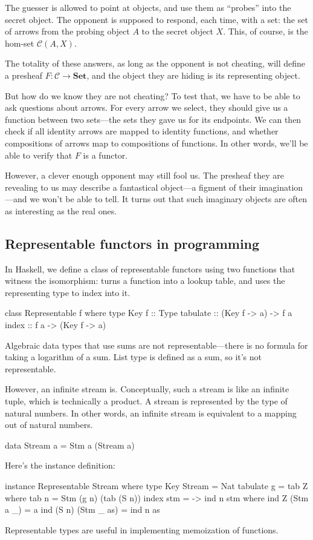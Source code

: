 \documentclass[DaoFP]{subfiles}
\begin{document}
The guesser is allowed to point at objects, and use them as ``probes'' into the secret object. The opponent is supposed to respond, each time, with a set: the set of arrows from the probing object $A$ to the secret object $X$. This, of course, is the hom-set $\mathcal{C}(A, X)$. 

The totality of these answers, as long as the opponent is not cheating, will define a presheaf $F \colon \mathcal{C} \to \mathbf{Set}$, and the object they are hiding is its representing object. 

But how do we know they are not cheating? To test that, we have to be able to ask questions about arrows. For every arrow we select, they should give us a function between two sets---the sets they gave us for its endpoints. We can then check if all identity arrows are mapped to identity functions, and whether compositions of arrows map to compositions of functions. In other words, we'll be able to verify that $F$ is a functor. 

However, a clever enough opponent may still fool us. The presheaf they are revealing to us may describe a fantastical object---a figment of their imagination---and we won't be able to tell. It turns out that such imaginary objects are often as interesting as the real ones. 

\subsection{Representable functors in programming}

In Haskell, we define a class of representable functors using two functions that witness the isomorphism:  turns a function into a lookup table, and  uses the representing type  to index into it.

\begin{haskell}
class Representable f where
  type Key f :: Type
  tabulate :: (Key f -> a) -> f a
  index    :: f a -> (Key f -> a)
\end{haskell}

Algebraic data types that use sums are not representable---there is no formula for taking a logarithm of a sum. List type is defined as a sum, so it's not representable. 

However, an infinite stream is. Conceptually, such a stream is like an infinite tuple, which is technically a product. A stream is represented by the type of natural numbers. In other words, an infinite stream is equivalent to a mapping out of natural numbers. 
\begin{haskell}
data Stream a = Stm a (Stream a)
\end{haskell}
Here's the instance definition:
\begin{haskell}
instance Representable Stream where
  type Key Stream = Nat
  tabulate g = tab Z
    where
      tab n = Stm (g n) (tab (S n))
  index stm = \n -> ind n stm
    where
      ind Z (Stm a _) = a
      ind (S n) (Stm _ as) = ind n as
\end{haskell}
Representable types are useful in implementing memoization of functions.
\end{document}
